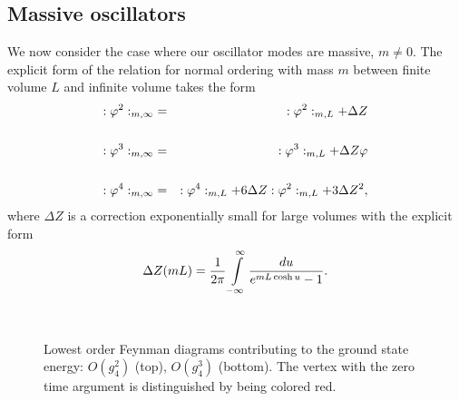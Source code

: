 \documentclass[twocolumn,secnumarabic,amssymb, nobibnotes, aps, prd]{revtex4-2}
\newcommand{\be}{\begin{equation}}
\newcommand{\ee}{\end{equation}}
\newcommand{\bea}{\begin{eqnarray}}
\newcommand{\eea}{\end{eqnarray}}
\begin{document}
\subsection{Massive oscillators}
We now consider the case where our oscillator modes are massive, $m\neq 0$.
The explicit form of the relation for normal ordering with mass $m$
between finite volume $L$ and infinite volume takes the form
\bea
:\varphi^2:_{m,\infty}&=&:\varphi^2:_{m,L}+\Delta Z\cr\cr
:\varphi^3:_{m,\infty}&=&:\varphi^3:_{m,L}+\Delta Z \varphi\cr\cr
:\varphi^4:_{m,\infty}&=&:\varphi^4:_{m,L}+6\Delta Z:\varphi^2:_{m,L}+3\Delta Z^2,
\eea
where $\Delta Z$ is a correction exponentially small for large volumes
with the explicit form
\be
\Delta Z(mL)=\frac{1}{2\pi}\intop_{-\infty}^{\infty}\frac{du}{e^{mL\cosh u}-1} .\label{zfuncdef}
\ee


\begin{figure}[h]
    \centering
     \\

    \caption{Lowest order Feynman diagrams contributing to the ground state energy: $O(g_4^2)$ (top), $O(g_4^3)$ (bottom). The vertex with the zero time argument is distinguished by being colored red. }
    \label{FigGSFeyns1}
\end{figure}
\end{document}
